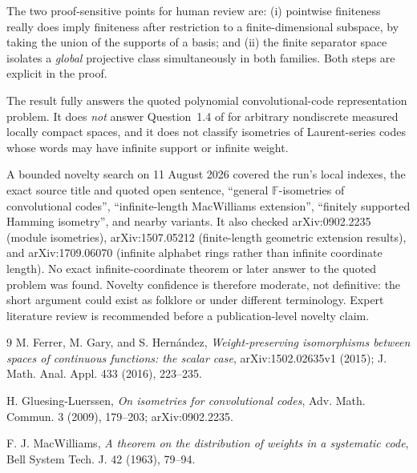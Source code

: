 \documentclass[11pt]{article}
\newcommand{\F}{\mathbb F}
\begin{document}
The two proof-sensitive points for human review are: (i) pointwise finiteness
really does imply finiteness after restriction to a finite-dimensional
subspace, by taking the union of the supports of a basis; and (ii) the finite
separator space isolates a \emph{global} projective class simultaneously in
both families.  Both steps are explicit in the proof.

The result fully answers the quoted polynomial convolutional-code
representation problem.  It does \emph{not} answer Question~1.4 of \cite{FGH}
for arbitrary nondiscrete measured locally compact spaces, and it does not
classify isometries of Laurent-series codes whose words may have infinite
support or infinite weight.

A bounded novelty search on 11 August 2026 covered the run's local indexes,
the exact source title and quoted open sentence, ``general $\F$-isometries of
convolutional codes'', ``infinite-length MacWilliams extension'', ``finitely
supported Hamming isometry'', and nearby variants.  It also checked
arXiv:0902.2235 (module isometries), arXiv:1507.05212 (finite-length geometric
extension results), and arXiv:1709.06070 (infinite alphabet rings rather than
infinite coordinate length).  No exact infinite-coordinate theorem or later
answer to the quoted problem was found.  Novelty confidence is therefore
moderate, not definitive: the short argument could exist as folklore or under
different terminology.  Expert literature review is recommended before a
publication-level novelty claim.

\small
\begin{thebibliography}{9}
M. Ferrer, M. Gary, and S. Hern\'andez,
\emph{Weight-preserving isomorphisms between spaces of continuous functions:
the scalar case}, arXiv:1502.02635v1 (2015); J. Math. Anal. Appl. 433 (2016),
223--235.

H. Gluesing-Luerssen,
\emph{On isometries for convolutional codes}, Adv. Math. Commun. 3 (2009),
179--203; arXiv:0902.2235.

F. J. MacWilliams,
\emph{A theorem on the distribution of weights in a systematic code},
Bell System Tech. J. 42 (1963), 79--94.
\end{thebibliography}
\end{document}
